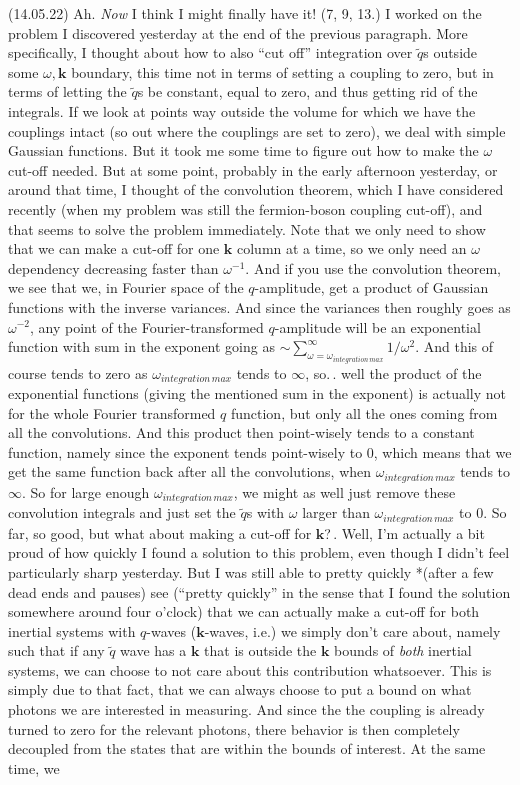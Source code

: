 \documentclass{report}
\begin{document}
(14.05.22) Ah. \emph{Now} I think I might finally have it! (7, 9, 13.) I worked on the problem I discovered yesterday at the end of the previous paragraph. More specifically, I thought about how to also ``cut off'' integration over $\tilde q$s outside some $\omega, \boldsymbol{k}$ boundary, this time not in terms of setting a coupling to zero, but in terms of letting the $\tilde q$s be constant, equal to zero, and thus getting rid of the integrals. If we look at points way outside the volume for which we have the couplings intact (so out where the couplings are set to zero), we deal with simple Gaussian functions. But it took me some time to figure out how to make the $\omega$ cut-off needed. But at some point, probably in the early afternoon yesterday, or around that time, I thought of the convolution theorem, which I have considered recently (when my problem was still the fermion-boson coupling cut-off), and that seems to solve the problem immediately. Note that we only need to show that we can make a cut-off for one $\boldsymbol{k}$ column at a time, so we only need an $\omega$ dependency decreasing faster than $\omega^{-1}$. And if you use the convolution theorem, we see that we, in Fourier space of the $q$-amplitude, get a product of Gaussian functions with the inverse variances. And since the variances then roughly goes as $\omega^{-2}$, any point of the Fourier-transformed $q$-amplitude will be an exponential function with sum in the exponent going as $\sim \sum_{\omega=\omega_{integration\, max}}^{\infty} 1 / \omega^2$. And this of course tends to zero as $\omega_{integration\, max}$ tends to $\infty$, so.\,. well the product of the exponential functions (giving the mentioned sum in the exponent) is actually not for the whole Fourier transformed $q$ function, but only all the ones coming from all the convolutions. And this product then point-wisely tends to a constant function, namely since the exponent tends point-wisely to 0, which means that we get the same function back after all the convolutions, when $\omega_{integration\, max}$ tends to $\infty$. So for large enough $\omega_{integration\, max}$, we might as well just remove these convolution integrals and just set the $\tilde q$s with $\omega$ larger than $\omega_{integration\, max}$ to 0. So far, so good, but what about making a cut-off for $\boldsymbol{k}$?\,. Well, I'm actually a bit proud of how quickly I found a solution to this problem, even though I didn't feel particularly sharp yesterday. But I was still able to pretty quickly *(after a few dead ends and pauses) see (``pretty quickly'' in the sense that I found the solution somewhere around four o'clock) that we can actually make a cut-off for both inertial systems with $q$-waves ($\boldsymbol{k}$-waves, i.e.) we simply don't care about, namely such that if any $\tilde q$ wave has a $\boldsymbol{k}$ that is outside the $\boldsymbol{k}$ bounds of \emph{both} inertial systems, we can choose to not care about this contribution whatsoever. This is simply due to that fact, that we can always choose to put a bound on what photons we are interested in measuring. And since the the coupling is already turned to zero for the relevant photons, there behavior is then completely decoupled from the states that are within the bounds of interest. At the same time, we 
\end{document}

